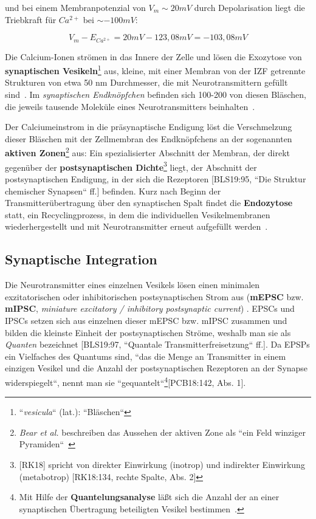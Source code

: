 {{\pagebreak

und bei einem Membranpotenzial von $V_m \sim 20 mV$ durch Depolarisation liegt die Triebkraft für $Ca^{2+}$ bei $\sim -100 mV$:

\begin{equation}
 V_m - E_{Ca^{2+}} = 20 mV - 123,08 mV = -103,08 mV
 \label{eq:gl-triebkraftca2}
\end{equation}


Die Calcium-Ionen strömen in das Innere der Zelle und lösen die Exozytose von \textbf{synaptischen Vesikeln}\footnote{
 ``\textit{vesicula}`` (lat.): ``Bläschen``
} aus, kleine, mit einer Membran von der IZF getrennte Strukturen von etwa 50 nm Durchmesser, die mit Neurotransmittern gefüllt sind~\cite[1000]{BCP18}.
Im \textit{synaptischen Endknöpfchen} befinden sich 100-200 von diesen Bläschen, die jeweils tausende Moleküle eines Neurotransmitters beinhalten~\cite[184]{KSJ+13}.

Der Calciumeinstrom in die präsynaptische Endigung löst die Verschmelzung dieser Bläschen mit der Zellmembran des Endknöpfchens an der sogenannten \textbf{aktiven Zonen}\footnote{
 \textit{Bear et al.} beschreiben das Aussehen der aktiven Zone als ``ein Feld winziger Pyramiden``~\cite[123]{BCP18}
} aus: Ein spezialisierter Abschnitt der Membran, der direkt gegenüber der \textbf{postsynaptischen Dichte}\footnote{
 [RK18] spricht von direkter Einwirkung (inotrop) und indirekter Einwirkung (metabotrop) [RK18:134, rechte Spalte, Abs. 2]
} liegt, der Abschnitt der postsynaptischen Endigung, in der sich die Rezeptoren [BLS19:95, ``Die Struktur chemischer Synapsen`` ff.] befinden.
Kurz nach Beginn der Transmitterübertragung über den synaptischen Spalt findet die \textbf{Endozytose} statt, ein Recyclingprozess, in dem die individuellen Vesikelmembranen wiederhergestellt und mit Neurotransmitter erneut aufgefüllt werden~\cite[133]{BCP18}.


\subsection{Synaptische Integration}

Die Neurotransmitter eines einzelnen Vesikels lösen einen minimalen exzitatorischen oder inhibitorischen postsynaptischen Strom aus (\textbf{mEPSC} bzw. \textbf{mIPSC}, \textit{miniature excitatory / inhibitory postsynaptic current}) . 
EPSCs und IPSCs setzen sich aus einzelnen dieser mEPSC bzw. mIPSC zusammen und bilden die kleinste Einheit der postsynaptischen Ströme, weshalb man sie als \textit{Quanten} bezeichnet [BLS19:97, ``Quantale Transmitterfreisetzung`` ff.]. 
Da EPSPs ein Vielfaches des Quantums sind, ``das die Menge an Transmitter in einem einzigen Vesikel und die Anzahl der postsynaptischen Rezeptoren an der Synapse widerspiegelt``, nennt man sie ``gequantelt``\footnote{
 Mit Hilfe der \textbf{Quantelungsanalyse} läßt sich die Anzahl der an einer synaptischen Übertragung beteiligten Vesikel bestimmen~\cite[142]{BCP18}.
}[PCB18:142, Abs. 1].

}}
